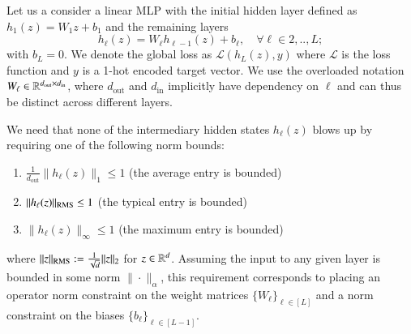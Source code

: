 \begin{table}
\centering
\caption{Example $\lmo$ choices for 1-hot encoded inputs.
}
\label{tbl:parameter:lmo:1hot}
\bgroup
\def\arraystretch{1.2}
\egroup
\end{table}



Let us a consider a linear MLP with the initial hidden layer defined as $h_1(z) = W_1z + b_1$ and the remaining layers
\begin{equation*}
h_\ell(z) = W_\ell h_{\ell-1}(z) + b_\ell, \quad \forall \ell \in 2,..,L;
\end{equation*}
with $b_L=0$.
We denote the global loss as $\mathcal L(h_L(z),y)$ where $\mathcal L$ is the loss function and $y$ is a 1-hot encoded target vector.
We use the overloaded notation $W_\ell \in \mathbb{R}^{d_\mathrm{out} \times d_\mathrm{in}}$, where $d_\mathrm{out}$ and $d_\mathrm{in}$ implicitly have dependency on $\ell$ and can thus be distinct across different layers.

We need that none of the intermediary hidden states $h_\ell(z)$ blows up by requiring one of the following norm bounds:
\begin{enumerate}[label=(\roman*)]
    \item $\tfrac{1}{d_\mathrm{out}}\|h_\ell(z)\|_1 \leq 1$ \hfill (the average entry is bounded)
    \item $\|h_\ell(z)\|_{\mathrm{RMS}} \leq 1$ \hfill (the typical entry is bounded)
    \item $\|h_\ell(z)\|_\infty\leq 1$ \hfill (the maximum entry is bounded)
\end{enumerate}
where $\|z\|_{\mathrm{RMS}}:= \tfrac{1}{\sqrt{d}}\|z\|_2$ for $z\in \mathbb{R}^d$.
Assuming the input to any given layer is bounded in some norm $\|\cdot\|_\alpha$, this requirement corresponds to placing an operator norm constraint on the weight matrices $\{W_\ell\}_{\ell\in [L]}$ and a norm constraint on the biases $\{b_\ell\}_{\ell\in [L-1]}$.

